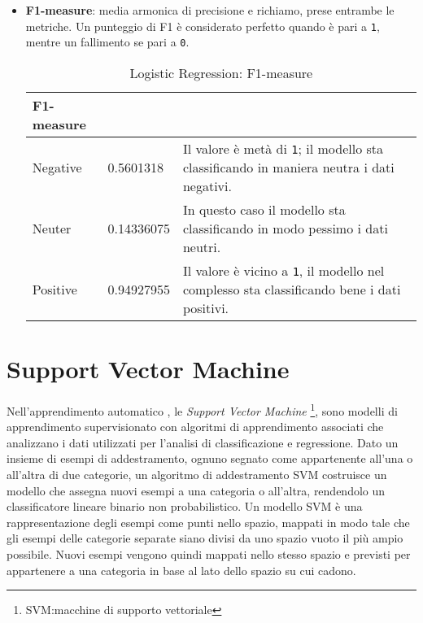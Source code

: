 \begin{itemize}
				\item \textbf{F1-measure}: media armonica di precisione e richiamo, prese entrambe le metriche. Un punteggio di F1 è considerato perfetto quando è pari a \verb|1|, mentre un fallimento se pari a \verb|0|. 
				\begin{table} [H]
					\caption{Logistic Regression: F1-measure} 
					\label{tab:F1-measureLogisticRegression}
					\centering
					\begin{tabular}{llp{}}
						\toprule 
						\textbf{F1-measure}	\\
						\midrule
						Negative  & 0.5601318  & Il valore è metà di \verb|1|; il modello sta classificando in maniera neutra i dati negativi.\\
						Neuter & 0.14336075 & In questo caso il modello sta classificando in modo pessimo i dati neutri.\\
						Positive & 0.94927955 & Il valore è vicino a \verb|1|, il modello nel complesso sta classificando bene i dati positivi.\\
						\bottomrule
					\end{tabular}
				\end{table} 			
			\end{itemize}
			

		\section{Support Vector Machine}
			Nell'apprendimento automatico , le \textit{Support Vector Machine} \footnote{SVM:macchine di supporto vettoriale}, sono modelli di apprendimento supervisionato con algoritmi di apprendimento associati che analizzano i dati utilizzati per l'analisi di classificazione e regressione. Dato un insieme di esempi di addestramento, ognuno segnato come appartenente all'una o all'altra di due categorie, un algoritmo di addestramento SVM costruisce un modello che assegna nuovi esempi a una categoria o all'altra, rendendolo un classificatore lineare binario non probabilistico. Un modello SVM è una rappresentazione degli esempi come punti nello spazio, mappati in modo tale che gli esempi delle categorie separate siano divisi da uno spazio vuoto il più ampio possibile. Nuovi esempi vengono quindi mappati nello stesso spazio e previsti per appartenere a una categoria in base al lato dello spazio su cui cadono.
			
